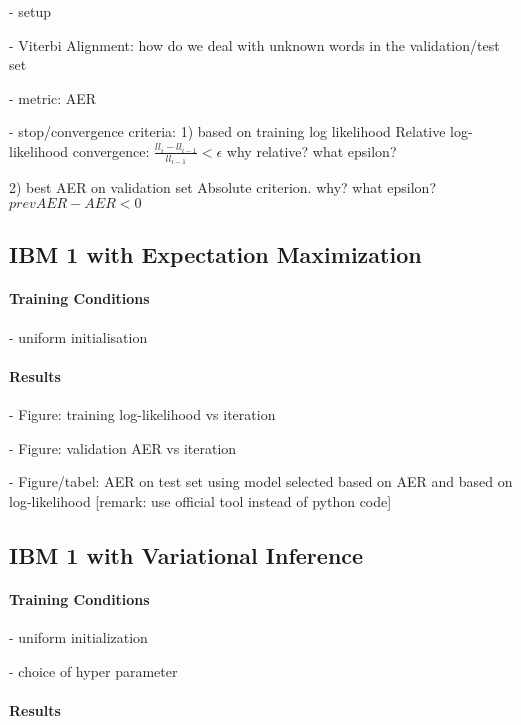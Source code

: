 \documentclass[11pt,a4paper]{article}
\begin{document}
- setup

- Viterbi Alignment: how do we deal with unknown words in the validation/test set

- metric: AER

- stop/convergence criteria:
1) based on training log likelihood
Relative log-likelihood convergence: 
$\frac{ll_i - ll_{i-1}}{ll_{i-1}} < \epsilon$
why relative? what epsilon?

2) best AER on validation set
Absolute criterion. why? what epsilon?
$prevAER - AER < 0$

\subsection{IBM 1 with Expectation Maximization}
\label{IBM1}


\paragraph{Training Conditions}

- uniform initialisation

\paragraph{Results}



- Figure: training log-likelihood vs iteration

- Figure: validation AER vs iteration

- Figure/tabel: AER on test set using model selected based on AER and based on log-likelihood [remark: use official tool instead of python code]  


\subsection{IBM 1 with Variational Inference}
\label{IBM1_Dirichlet}


\paragraph{Training Conditions}

- uniform initialization

- choice of hyper parameter

\paragraph{Results}
\end{document}
